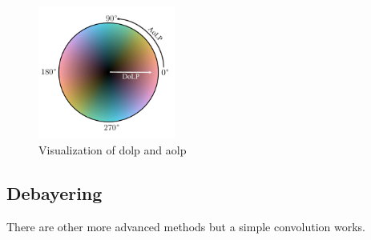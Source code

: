 \begin{figure}[H]
    \centering
    \includegraphics[width=0.4\textwidth]{figures/cmap/aolp_dolp_cmap.pdf}
    \caption{Visualization of \gls{dolp} and \gls{aolp}}
\end{figure}

\subsection*{Debayering}
There are other more advanced methods but a simple convolution works.






